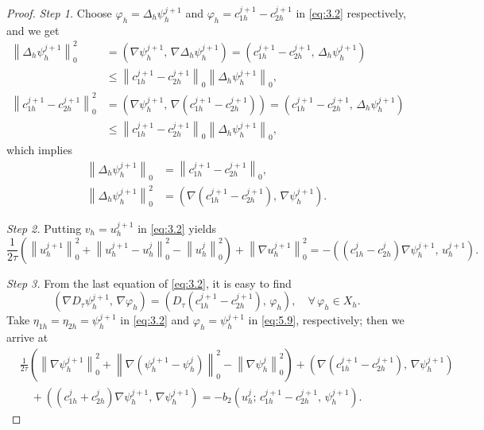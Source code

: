 \documentclass[a4paper,fleqn]{cas-sc}
\numberwithin{equation}{section}
\theoremstyle{definition}
\begin{document}
\begin{proof}
\textit{Step 1.}
Choose $\varphi_{h} = \Delta_{h}\psi_{h}^{j+1}$ and
$\varphi_{h} = c_{1h}^{j+1} - c_{2h}^{j+1}$ in \eqref{eq:3.2} respectively, and we get
\begin{align}
  \left\|\Delta_{h}\psi_{h}^{j+1}\right\|_{0}^{2}
  &= \left(\nabla\psi_{h}^{j+1},\, \nabla\Delta_{h}\psi_{h}^{j+1}\right)
   = \left(c_{1h}^{j+1} - c_{2h}^{j+1},\, \Delta_{h}\psi_{h}^{j+1}\right)
   \nonumber\\
  &\leq
   \left\|c_{1h}^{j+1} - c_{2h}^{j+1}\right\|_{0}
   \left\|\Delta_{h}\psi_{h}^{j+1}\right\|_{0},
   \label{eq:5.4}\\[4pt]
  \left\|c_{1h}^{j+1} - c_{2h}^{j+1}\right\|_{0}^{2}
  &= \left(\nabla\psi_{h}^{j+1},\, \nabla(c_{1h}^{j+1} - c_{2h}^{j+1})\right)
   = \left(c_{1h}^{j+1} - c_{2h}^{j+1},\, \Delta_{h}\psi_{h}^{j+1}\right)
   \nonumber\\
  &\leq
   \left\|c_{1h}^{j+1} - c_{2h}^{j+1}\right\|_{0}
   \left\|\Delta_{h}\psi_{h}^{j+1}\right\|_{0},
   \label{eq:5.5}
\end{align}
which implies
\begin{align}
  \left\|\Delta_{h}\psi_{h}^{j+1}\right\|_{0}
  &= \left\|c_{1h}^{j+1} - c_{2h}^{j+1}\right\|_{0},
  \label{eq:5.6}\\
  \left\|\Delta_{h}\psi_{h}^{j+1}\right\|_{0}^{2}
  &= \left(\nabla(c_{1h}^{j+1} - c_{2h}^{j+1}),\,\nabla\psi_{h}^{j+1}\right).
  \label{eq:5.7}
\end{align}

\textit{Step 2.}
Putting $v_{h} = u_{h}^{j+1}$ in \eqref{eq:3.2} yields
\begin{equation}
  \frac{1}{2\tau}\!\left(
    \left\|u_{h}^{j+1}\right\|_{0}^{2}
    + \left\|u_{h}^{j+1} - u_{h}^{j}\right\|_{0}^{2}
    - \left\|u_{h}^{j}\right\|_{0}^{2}
  \right)
  + \left\|\nabla u_{h}^{j+1}\right\|_{0}^{2}
  = -\!\left((c_{1h}^{j} - c_{2h}^{j})\nabla\psi_{h}^{j+1},\, u_{h}^{j+1}\right).
  \label{eq:5.8}
\end{equation}

\textit{Step 3.}
From the last equation of \eqref{eq:3.2}, it is easy to find
\begin{equation}
  \left(\nabla D_{\tau}\psi_{h}^{j+1},\, \nabla\varphi_{h}\right)
  = \left(D_{\tau}(c_{1h}^{j+1} - c_{2h}^{j+1}),\, \varphi_{h}\right),
  \quad \forall\,\varphi_{h} \in X_{h}.
  \label{eq:5.9}
\end{equation}
Take $\eta_{1h} = \eta_{2h} = \psi_{h}^{j+1}$ in \eqref{eq:3.2} and
$\varphi_{h} = \psi_{h}^{j+1}$ in \eqref{eq:5.9}, respectively; then we arrive at
\begin{align}
  &\frac{1}{2\tau}\!\left(
    \left\|\nabla\psi_{h}^{j+1}\right\|_{0}^{2}
    + \left\|\nabla(\psi_{h}^{j+1} - \psi_{h}^{j})\right\|_{0}^{2}
    - \left\|\nabla\psi_{h}^{j}\right\|_{0}^{2}
  \right)
  + \left(\nabla(c_{1h}^{j+1} - c_{2h}^{j+1}),\, \nabla\psi_{h}^{j+1}\right)
  \nonumber\\
  &\quad
  + \left((c_{1h}^{j} + c_{2h}^{j})\nabla\psi_{h}^{j+1},\, \nabla\psi_{h}^{j+1}\right)
  = -b_{2}\!\left(u_{h}^{j};\, c_{1h}^{j+1} - c_{2h}^{j+1},\, \psi_{h}^{j+1}\right).
  \label{eq:5.10}
\end{align}


\end{proof}
\end{document}
